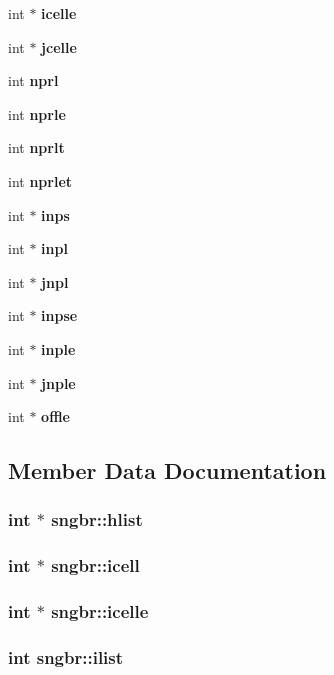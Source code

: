 \begin{CompactItemize}
int $\ast$ {\bf icelle}
\item 
int $\ast$ {\bf jcelle}
\item 
int {\bf nprl}
\item 
int {\bf nprle}
\item 
int {\bf nprlt}
\item 
int {\bf nprlet}
\item 
int $\ast$ {\bf inps}
\item 
int $\ast$ {\bf inpl}
\item 
int $\ast$ {\bf jnpl}
\item 
int $\ast$ {\bf inpse}
\item 
int $\ast$ {\bf inple}
\item 
int $\ast$ {\bf jnple}
\item 
int $\ast$ {\bf offle}
\end{CompactItemize}


\subsection{Member Data Documentation}
\subsubsection{\setlength{\rightskip}{0pt plus 5cm}int $\ast$ {\bf sngbr::hlist}}\label{structsngbr_48ca0b9e46f726904ac9445ccd92db2f}


\subsubsection{\setlength{\rightskip}{0pt plus 5cm}int $\ast$ {\bf sngbr::icell}}\label{structsngbr_947c5d8dfde59cf17171d904ebc73957}


\subsubsection{\setlength{\rightskip}{0pt plus 5cm}int $\ast$ {\bf sngbr::icelle}}\label{structsngbr_14fbb696d9e6c6e98242abd9839e0dbf}


\subsubsection{\setlength{\rightskip}{0pt plus 5cm}int {\bf sngbr::ilist}}\label{structsngbr_729d3809b80ca1ef52a75a77aa48e0f2}


